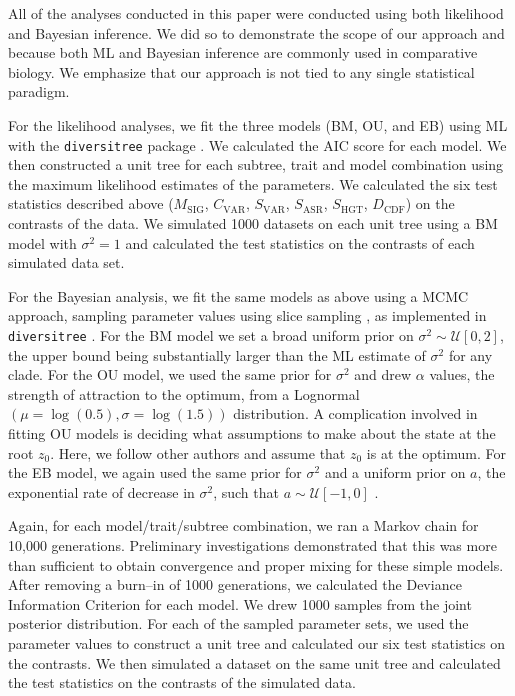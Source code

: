 \documentclass[a4paper,11pt]{article}
\begin{document}
All of the analyses conducted in this paper were conducted using both likelihood and Bayesian inference. We did so to demonstrate the scope of our approach and because both ML and Bayesian inference are commonly used in comparative biology. We emphasize that our approach is not tied to any single statistical paradigm.

For the likelihood analyses, we fit the three models (BM, OU, and EB) using ML with the \texttt{diversitree} package \citep{FitzJohn2012}. We calculated the AIC score for each model. We then constructed a unit tree for each subtree, trait and model combination using the maximum likelihood estimates of the parameters. We calculated the six test statistics described above ($M_{\text{SIG}}$, $C_{\text{VAR}}$, $S_{\text{VAR}}$, $S_{\text{ASR}}$, $S_{\text{HGT}}$, $D_{\text{CDF}}$) on the contrasts of the data. We simulated 1000 datasets on each unit tree using a BM model with $\sigma^2=1$ and calculated the test statistics on the contrasts of each simulated data set. 

For the Bayesian analysis, we fit the same models as above using a MCMC approach, sampling parameter values using slice sampling \citep{Nealslice}, as implemented in  \texttt{diversitree} \citep{FitzJohn2012}. For the BM model we set a broad uniform prior on $\sigma^2 \sim \mathcal{U}[0, 2]$, the upper bound being substantially larger than the ML estimate of $\sigma^2$ for any clade. For the OU model, we used the same prior for $\sigma^2$ and drew $\alpha$ values, the strength of attraction to the optimum, from a Lognormal$(\mu=\log(0.5),\sigma= \log(1.5))$ distribution. A complication involved in fitting OU models is deciding what assumptions to make about the state at the root $z_0$. Here, we follow other authors \citep{ButlerKing2004,Harmon2010} and assume that $z_0$ is at the optimum. For the EB model, we again used the same prior for $\sigma^2$ and a uniform prior on $a$, the exponential rate of decrease in $\sigma^2$, such that $a \sim \mathcal{U}[-1, 0]$ \citep[the minimum value is much more negative than we would typically expect;][]{SlaterPennell}.

Again, for each model/trait/subtree combination, we ran a Markov chain for 10,000 generations. Preliminary investigations demonstrated that this was more than sufficient to obtain convergence and proper mixing for these simple models. After removing a burn--in of 1000 generations, we calculated the Deviance Information Criterion \citep[DIC, a Bayesian analog of AIC;][]{dic} for each model. We drew 1000 samples from the joint posterior distribution. For each of the sampled parameter sets, we used the parameter values to construct a unit tree and calculated our six test statistics on the contrasts. We then simulated a dataset on the same unit tree and calculated the test statistics on the contrasts of the simulated data. 
\end{document}
